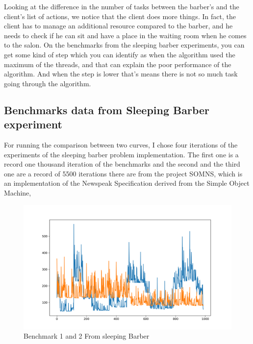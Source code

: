 \documentclass[12pt,a4paper]{article}
\begin{document}
Looking at the difference in the number of tasks between the barber's and the client's list of actions, we notice that the client does more things. In fact, the client has to manage an additional resource compared to the barber, and he needs to check if he can sit and have a place in the waiting room when he comes to the salon. On the benchmarks from the sleeping barber experiments, you can get some kind of step which you can identify as when the algorithm used the maximum of the threads, and that can explain the poor performance of the algorithm. And when the step is lower that's means there is not so much task going through the algorithm.

\subsection{Benchmarks data from Sleeping Barber experiment}

For running the comparison between two curves, I chose four iterations of the experiments of the sleeping barber problem implementation. The first one is a record one thousand iteration of the benchmarks and the second and the third one are a record of 5500 iterations there are from the project SOMNS, which is an implementation of the Newspeak Specification derived from the Simple Object Machine,

\begin{figure}[h!]
    \centering
    \includegraphics[width=1\textwidth]{plot_0.png}
    \caption{Benchmark 1 and 2 From sleeping Barber}
    \label{fig:bench_1_2}
\end{figure}
\end{document}

